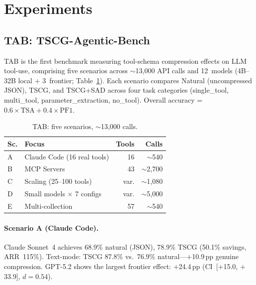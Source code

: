 \section{Experiments}
\label{sec:experiments}


\subsection{TAB: TSCG-Agentic-Bench}
\label{sec:tab-benchmark}

TAB is the first benchmark measuring tool-schema compression effects on LLM tool-use, comprising five scenarios across ${\sim}$13{,}000 API calls and 12~models (4B--32B local + 3~frontier; Table~\ref{tab:tab-overview}).
Each scenario compares Natural (uncompressed JSON), TSCG, and TSCG+SAD across four task categories (single\_tool, multi\_tool, parameter\_extraction, no\_tool).
Overall accuracy = $0.6 \times \text{TSA} + 0.4 \times \text{PF1}$.

\begin{table}[h]
\centering
\small
\caption{TAB: five scenarios, ${\sim}$13{,}000 calls.}
\label{tab:tab-overview}
\begin{tabular}{llrr}
\toprule
\textbf{Sc.} & \textbf{Focus} & \textbf{Tools} & \textbf{Calls} \\
\midrule
A & Claude Code (16 real tools) & 16 & ${\sim}$540 \\
B & MCP Servers & 43 & ${\sim}$2{,}700 \\
C & Scaling (25--100 tools) & var. & ${\sim}$1{,}080 \\
D & Small models $\times$ 7 configs & var. & ${\sim}$5{,}000 \\
E & Multi-collection & 57 & ${\sim}$540 \\
\bottomrule
\end{tabular}
\end{table}

\paragraph{Scenario A (Claude Code).}
Claude Sonnet~4 achieves 68.9\% natural (JSON), 78.9\% TSCG (50.1\% savings, ARR~115\%).
Text-mode: TSCG 87.8\% vs.\ 76.9\% natural---$+$10.9\,pp genuine compression.
GPT-5.2 shows the largest frontier effect: $+$24.4\,pp (CI~[$+$15.0, $+$33.9], $d{=}0.54$).

